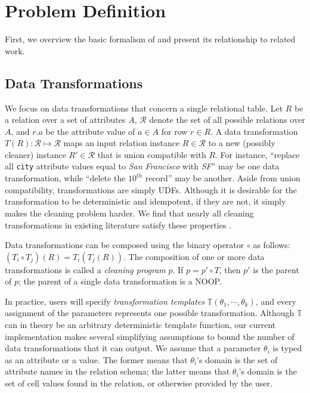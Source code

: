 \section{Problem Definition}
First, we overview the basic formalism of \sys and present its relationship to related work.

\subsection{Data Transformations}
We focus on data transformations that concern a single relational table. 
Let $R$ be a relation over a set of attributes $A$,  $\mathcal{R}$ denote the set of all possible relations over $A$, and $r.a$ be the attribute value of $a \in A$ for row $r \in R$.
A data transformation $T(R): \mathcal{R} \mapsto \mathcal{R}$ maps an input relation instance $R \in \mathcal{R}$ to a new (possibly cleaner) instance $R' \in \mathcal{R}$ that is union compatible with $R$.  For instance, ``replace all \texttt{city} attribute values equal to {\it San Francisco} with {\it SF}'' may be one data transformation, while ``delete the $10^{th}$ record'' may be another.   
Aside from union compatibility, transformations are simply UDFs.
Although it is desirable for the transformation to be deterministic and idempotent, if they are not, it simply makes the cleaning problem harder.
We find that nearly all cleaning transformations in existing literature satisfy these properties . 

Data transformations can be composed using the binary operator $\circ$ as follows: $(T_i \circ T_j)(R) =  T_i(T_j(R))$.
The composition of one or more data transformations is called a {\it cleaning program} $p$.   If $p = p' \circ T$, then $p'$ is the parent of $p$; the parent of a single data transformation is a NOOP.  

In practice, users will specify {\it transformation templates} $\mathbb{T}(\theta_1,\cdots,\theta_k)$, and every assignment of the parameters represents one possible transformation.  
Although $\mathbb{T}$ can in theory be an arbitrary deterministic template function, our current implementation makes several simplifying assumptions to bound the number of data transformations that it can output.  We assume that a parameter $\theta_i$ is typed as an attribute or a value.  The former means that $\theta_i$'s domain is the set of attribute names in the relation schema; the latter means that $\theta_i$'s domain is the set of cell values found in the relation, or otherwise provided by the user. 

